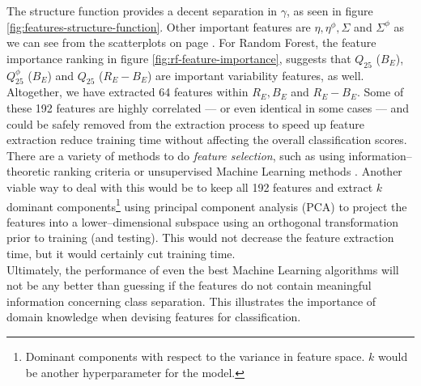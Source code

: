 The structure function provides a decent separation in $\gamma$, as seen in figure \ref{fig:features-structure-function}. Other important features are $\eta, \eta^\phi, \Sigma$ and $\Sigma^\phi$ as we can see from the scatterplots on page \pageref{fig:features-scatterplot}. For Random Forest, the feature importance ranking in figure \ref{fig:rf-feature-importance}, suggests that $Q_{25}$ ($B_E$), $Q_{25}^\phi$ ($B_E$) and $Q_{25}$ ($R_E - B_E$) are important variability features, as well.\\

Altogether, we have extracted 64 features within $R_E, B_E$ and $R_E - B_E$. Some of these 192 features are highly correlated --- or even identical in some cases --- and could be safely removed from the extraction process to speed up feature extraction reduce training time without affecting the overall classification scores. There are a variety of methods to do \emph{feature selection}, such as using information--theoretic ranking criteria or unsupervised Machine Learning methods \citep{guyon2003}. Another viable way to deal with this would be to keep all 192 features and extract $k$ dominant components\footnote{Dominant components with respect to the variance in feature space. $k$ would be another hyperparameter for the model.} using principal component analysis (PCA) to project the features into a lower--dimensional subspace using an orthogonal transformation prior to training (and testing). This would not decrease the feature extraction time, but it would certainly cut training time.\\

Ultimately, the performance of even the best Machine Learning algorithms will not be any better than guessing if the features do not contain meaningful information concerning class separation. This illustrates the importance of domain knowledge when devising features for classification.



